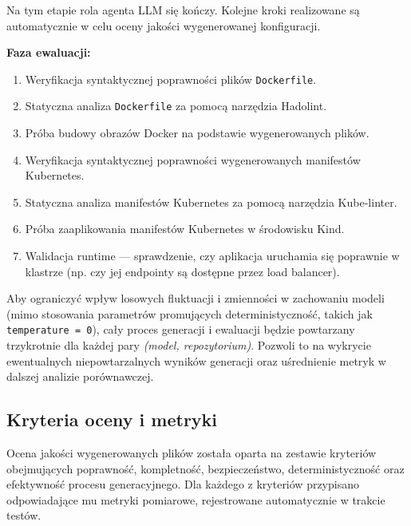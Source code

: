 Na tym etapie rola agenta LLM się kończy. Kolejne kroki realizowane są automatycznie w celu oceny jakości wygenerowanej konfiguracji.

\noindent
\textbf{Faza ewaluacji:}

\begin{enumerate}[resume]
    \item Weryfikacja syntaktycznej poprawności plików \texttt{Dockerfile}.
    \item Statyczna analiza \texttt{Dockerfile} za pomocą narzędzia Hadolint.
    \item Próba budowy obrazów Docker na podstawie wygenerowanych plików.
    \item Weryfikacja syntaktycznej poprawności wygenerowanych manifestów Kubernetes.
    \item Statyczna analiza manifestów Kubernetes za pomocą narzędzia Kube-linter.
    \item Próba zaaplikowania manifestów Kubernetes w środowisku Kind.
    \item Walidacja runtime — sprawdzenie, czy aplikacja uruchamia się poprawnie w klastrze (np. czy jej endpointy są dostępne przez load balancer).
\end{enumerate}

Aby ograniczyć wpływ losowych fluktuacji i zmienności w zachowaniu modeli (mimo stosowania parametrów promujących deterministyczność, takich jak \texttt{temperature = 0}), cały proces generacji i ewaluacji będzie powtarzany trzykrotnie dla każdej pary \textit{(model, repozytorium)}. Pozwoli to na wykrycie ewentualnych niepowtarzalnych wyników generacji oraz uśrednienie metryk w dalszej analizie porównawczej.

\subsection{Kryteria oceny i metryki}

Ocena jakości wygenerowanych plików została oparta na zestawie kryteriów obejmujących poprawność, kompletność, bezpieczeństwo, deterministyczność oraz efektywność procesu generacyjnego. Dla każdego z kryteriów przypisano odpowiadające mu metryki pomiarowe, rejestrowane automatycznie w trakcie testów.

